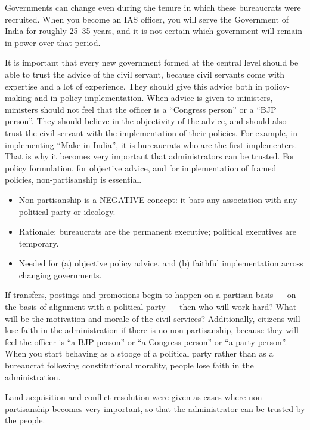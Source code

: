 Governments can change even during the tenure in which these bureaucrats were recruited. When you become an IAS officer, you will serve the Government of India for roughly 25--35 years, and it is not certain which government will remain in power over that period.

It is important that every new government formed at the central level should be able to trust the advice of the civil servant, because civil servants come with expertise and a lot of experience. They should give this advice both in policy-making and in policy implementation. When advice is given to ministers, ministers should not feel that the officer is a ``Congress person'' or a ``BJP person''. They should believe in the objectivity of the advice, and should also trust the civil servant with the implementation of their policies. For example, in implementing ``Make in India'', it is bureaucrats who are the first implementers. That is why it becomes very important that administrators can be trusted. For policy formulation, for objective advice, and for implementation of framed policies, non-partisanship is essential.

\begin{CriticalPoint}
\begin{itemize}
\item Non-partisanship is a NEGATIVE concept: it bars any association with any political party or ideology.
\item Rationale: bureaucrats are the permanent executive; political executives are temporary.
\item Needed for (a) objective policy advice, and (b) faithful implementation across changing governments.
\end{itemize}
\end{CriticalPoint}

If transfers, postings and promotions begin to happen on a partisan basis --- on the basis of alignment with a political party --- then who will work hard? What will be the motivation and morale of the civil services? Additionally, citizens will lose faith in the administration if there is no non-partisanship, because they will feel the officer is ``a BJP person'' or ``a Congress person'' or ``a party person''. When you start behaving as a stooge of a political party rather than as a bureaucrat following constitutional morality, people lose faith in the administration.

\begin{ExampleBox}
Land acquisition and conflict resolution were given as cases where non-partisanship becomes very important, so that the administrator can be trusted by the people.
\end{ExampleBox}

